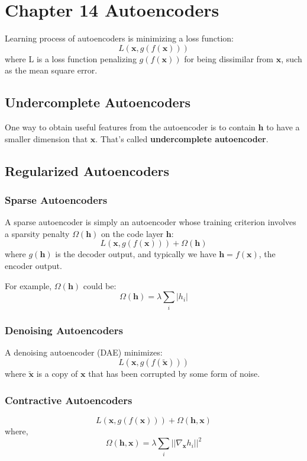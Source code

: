 \documentclass[12pt]{article}
\numberwithin{equation}{section}
\begin{document}
\section{Chapter 14 Autoencoders}
Learning process of autoencoders is minimizing a loss function:
\begin{equation}
	L(\bm{x},g(f(\bm{x})))
\end{equation}
where L is a loss function penalizing $g(f(\bm{x}))$ for being dissimilar from $\bm{x}$, such as the mean square error.
\subsection{Undercomplete Autoencoders}
	One way to obtain useful features from the autoencoder is to contain $\bm{h}$ to have a smaller dimension that $\bm{x}$. That's called \textbf{undercomplete autoencoder}.
\subsection{Regularized Autoencoders}
\subsubsection{Sparse Autoencoders}
	A sparse autoencoder is simply an autoencoder whose training criterion involves a sparsity penalty $\Omega(\bm{h})$ on the code layer $\bm{h}$:
	\begin{equation}
		L(\bm{x},g(f(\bm{x})))+\Omega(\bm{h})
	\end{equation}
	where $g(\bm{h})$ is the decoder output, and typically we have $\bm{h}=f(\bm{x})$, the encoder output. \par
	For example, $\Omega(\bm{h})$ could be:
	\begin{equation}
		\Omega(\bm{h})=\lambda \sum_i |h_i|
	\end{equation}	
\subsubsection{Denoising Autoencoders}
	A denoising autoencoder (DAE) minimizes:
	\begin{equation}
		L(\bm{x},g(f(\bm{\tilde{x}})))
	\end{equation}	
	where $\bm{\tilde{x}}$ is a copy of $\bm{x}$ that has been corrupted by some form of noise.
\subsubsection{Contractive Autoencoders}
	\begin{equation}
		L(\bm{x},g(f(\bm{x})))+\Omega(\bm{h,x})
	\end{equation}
	where,
	\begin{equation}
		\Omega(\bm{h,x})=\lambda \sum_i  ||{\nabla_{\bm{x}} h_i}||^2
	\end{equation}
\end{document}
